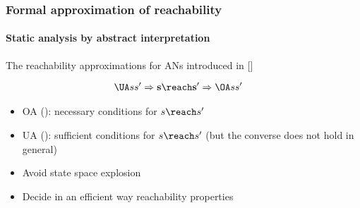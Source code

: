 \begin{frame}[c]
 \frametitle{Formal approximation of reachability}
\framesubtitle{Static analysis by abstract interpretation}
 
The reachability approximations  for ANs introduced in
{\small \color{darkgreen} [\citepmrmscs] }%


$$
\begin{align*}
\UA s {s'}&\Rightarrow {\bf s\reach s'} \Rightarrow \OA s {s'}
\end{align*}
$$
\begin{itemize}
\item OA (): necessary conditions for {\bf $s\reach s'$} %
\item UA (): sufficient conditions for {\bf $s\reach s'$} %
(but the converse does not hold in general)
\end{itemize}

\begin{itemize}
\item Avoid state space explosion
\item Decide in an efficient way reachability properties
\end{itemize}

\end{frame}


